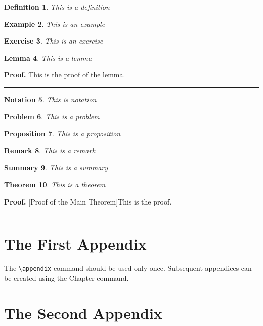 \documentclass[letterpaper,12pt,openany,reqno]{book}%
\newtheorem{theorem}{Theorem}
\newtheorem{definition}[theorem]{Definition}
\newtheorem{example}[theorem]{Example}
\newtheorem{exercise}[theorem]{Exercise}
\newtheorem{lemma}[theorem]{Lemma}
\newtheorem{notation}[theorem]{Notation}
\newtheorem{problem}[theorem]{Problem}
\newtheorem{proposition}[theorem]{Proposition}
\newtheorem{remark}[theorem]{Remark}
\newtheorem{summary}[theorem]{Summary}
\newenvironment{proof}[1][Proof]{\textbf{#1.} }{\ \rule{0.5em}{0.5em}}
\begin{document}
\begin{emumerate}
\begin{definition}
This is a definition
\end{definition}

\begin{example}
This is an example
\end{example}

\begin{exercise}
This is an exercise
\end{exercise}

\begin{lemma}
This is a lemma
\end{lemma}

\begin{proof}
This is the proof of the lemma.
\end{proof}

\begin{notation}
This is notation
\end{notation}

\begin{problem}
This is a problem
\end{problem}

\begin{proposition}
This is a proposition
\end{proposition}

\begin{remark}
This is a remark
\end{remark}

\begin{summary}
This is a summary
\end{summary}

\begin{theorem}
This is a theorem
\end{theorem}

\begin{proof}
[Proof of the Main Theorem]This is the proof.
\end{proof}

\appendix

\chapter{The First Appendix}

The \verb"\appendix" command should be used only once. Subsequent appendices can
be created using the Chapter command.

\chapter{The Second Appendix}


\end{emumerate}
\end{document}
